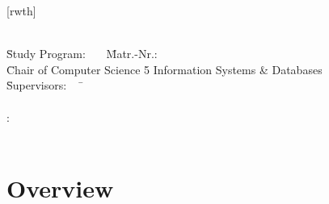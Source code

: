 \documentclass[aspectratio=169]{beamer}
\author[\firstname]{\firstname~\lastname~\email}
\institute[RWTH]{RWTH Aachen University}
\begin{document}
[rwth]{}
\begin{frame}[plain]
\titlepage

\parbox{0cm}{
  \vspace{-5.5em}
  \begin{tabbing}
    \=\textbf{\firstname~\lastname}\=\\[0.5em]
    \=Study Program: \studyProgram~~~\=Matr.-Nr.:\matrNo\\[0.5em]
    \=Chair of Computer Science 5 Information Systems \& Databases \=\\[0.5em]
    \={Supervisors}:~~~\=\firstsupervisor\\
    \>                 \>\secondsupervisor\\[0.5em]
    :       \>\firstadvisor\ifdefined\secondadvisor\\
    \>                 \>\secondadvisor\\[0.5em]
    \fi
  \end{tabbing}
}
\end{frame}



\section*{Overview}
\begin{frame}
  \tableofcontents %
\end{frame}
\end{document}
